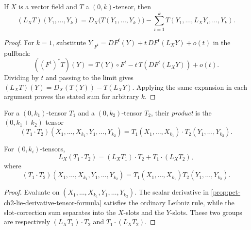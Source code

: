 \begin{proposition}
  \label{prop:pet-ch2-lie-derivative-tensor-formula}
  \leanok
  If $X$ is a vector field and $T$ a $(0,k)$-tensor, then
  \[
    (L_XT)(Y_1,\dots,Y_k)
    = D_X\big(T(Y_1,\dots,Y_k)\big)-\sum_{i=1}^kT(Y_1,\dots,L_XY_i,\dots,Y_k).
  \]
\end{proposition}
\begin{proof}
  \leanok
  \sketch
  For $k=1$, substitute
  $Y|_{F^t}=DF^t(Y)+t\,DF^t(L_XY)+o(t)$ in the pullback:
  \[
    ((F^t)^*T)(Y)
      =T(Y)\circ F^t-t\,T(DF^t(L_XY))+o(t).
  \]
  Dividing by $t$ and passing to the limit gives
  $(L_XT)(Y)=D_X(T(Y))-T(L_XY)$. Applying the same expansion in each
  argument proves the stated sum for arbitrary $k$.
\end{proof}


\begin{definition}
  \label{def:pet-ch2-tensor-product}
  \leanok
  For a $(0,k_1)$-tensor $T_1$ and a $(0,k_2)$-tensor $T_2$, their
  \emph{product} is the $(0,k_1+k_2)$-tensor
  \[
    (T_1\cdot T_2)(X_1,\dots,X_{k_1},Y_1,\dots,Y_{k_2})
    =T_1(X_1,\dots,X_{k_1})\cdot T_2(Y_1,\dots,Y_{k_2}).
  \]
\end{definition}

\begin{proposition}
  \label{prop:pet-ch2-lie-derivative-product-rule}
  \leanok
  For $(0,k_i)$-tensors,
  \[
    L_X(T_1\cdot T_2)
      =(L_XT_1)\cdot T_2+T_1\cdot(L_XT_2),
  \]
  where
  \[
    (T_1\cdot T_2)(X_1,\dots,X_{k_1},Y_1,\dots,Y_{k_2})
      =T_1(X_1,\dots,X_{k_1})T_2(Y_1,\dots,Y_{k_2}).
  \]
\end{proposition}
\begin{proof}
  \leanok
  \sketch
  Evaluate on
  $(X_1,\dots,X_{k_1},Y_1,\dots,Y_{k_2})$. The scalar derivative in
  \cref{prop:pet-ch2-lie-derivative-tensor-formula} satisfies the ordinary
  Leibniz rule, while the slot-correction sum separates into the $X$-slots and
  the $Y$-slots. These two groups are respectively
  $(L_XT_1)\cdot T_2$ and $T_1\cdot(L_XT_2)$.
\end{proof}

